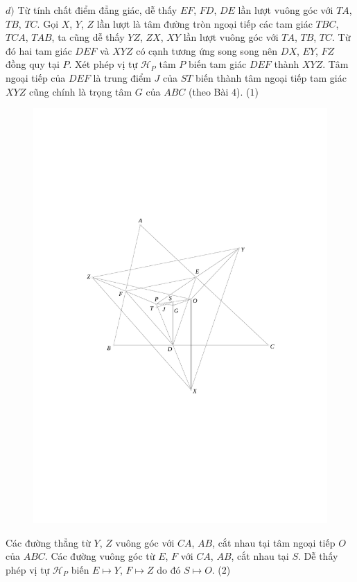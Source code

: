 \begin{multicols}{2}
	\vskip 0.1cm	
	$d)$ Từ tính chất điểm đẳng giác, dễ thấy $EF$, $FD$, $DE$ lần lượt vuông góc với $TA$, $TB$, $TC$. Gọi $X$, $Y$, $Z$ lần lượt là tâm đường tròn ngoại tiếp các tam giác $TBC$, $TCA$, $TAB$, ta cũng dễ thấy $YZ$, $ZX$, $XY$ lần lượt vuông góc với $TA$, $TB$, $TC$. Từ đó hai tam giác $DEF$ và $XYZ$ có cạnh tương ứng song song nên $DX$, $EY$, $FZ$ đồng quy tại $P$. Xét phép vị tự $\mathcal{H}_P$ tâm $P$ biến tam giác $DEF$ thành $XYZ$. Tâm ngoại tiếp của $DEF$ là trung điểm $J$ của $ST$ biến thành tâm ngoại tiếp tam giác $XYZ$ cũng chính là trọng tâm $G$ của \linebreak$ABC$ (theo Bài $4$). \hfill ($1$)
	\begin{figure}[H]
		\vspace*{-5pt}
		\centering
		\captionsetup{labelformat= empty, justification=centering}
		\includegraphics[width= 0.9\linewidth]{figure7667}
		\vspace*{-10pt}
	\end{figure}
	Các đường thẳng từ $Y$, $Z$ vuông góc với $CA$, $AB$, cắt nhau tại tâm ngoại tiếp $O$ của $ABC$. Các đường vuông góc từ $E$, $F$ với $CA$, $AB$, cắt nhau tại $S$. Dễ thấy phép vị tự $\mathcal{H}_P$ biến $E\mapsto Y$, $F\mapsto Z$ do đó $S\mapsto O$. \hfill($2$)

\end{multicols}
